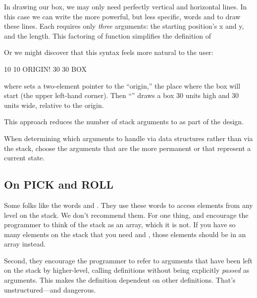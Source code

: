 In drawing our box, we may only need perfectly vertical and horizontal
lines. In this case we can write the more powerful, but less specific,
words  and  to draw these lines. Each
requires only \emph{three} arguments: the starting position's x and y, and
the length. This factoring of function simplifies the definition of

Or we might discover that this syntax feels more natural to the
user:

\begin{Code}
10 10 ORIGIN! 30 30 BOX
\end{Code}
where  sets a two-element pointer to the ``origin,'' the
place where the box will start (the upper left-hand corner). Then
``'' draws a box 30 units high and 30 units wide,
relative to the origin.

This approach reduces the number of stack arguments to  as
part of the design.

\begin{tip}
When determining which arguments to handle via data structures rather
than via the stack, choose the arguments that are the more permanent or
that represent a current state.
\end{tip}%
%
%
%
%

\subsection{On PICK and ROLL}%
%
%
%

Some folks like the words  and . They use these
words to access elements from any level on the stack. We don't recommend
them.  For one thing,  and  encourage the
programmer to think of the stack as an array, which it is not. If you have
so many elements on the stack that you need  and
, those elements should be in an array instead.

Second, they encourage the programmer to refer to arguments that
have been left on the stack by higher-level, calling definitions without
being explicitly \emph{passed} as arguments. This makes the definition
dependent on other definitions. That's unstructured---and dangerous.

